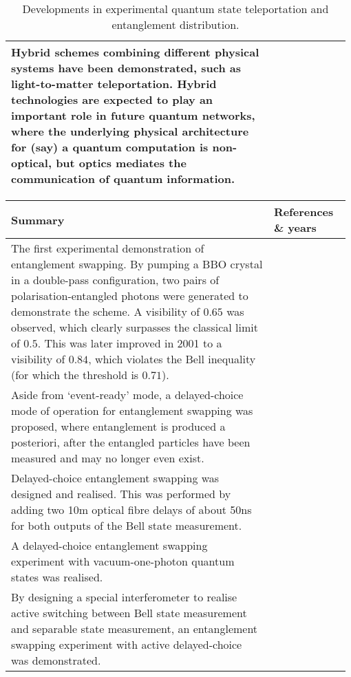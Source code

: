 \begin{table*}[!htbp]
\begin{tabular}{|p{0.755\linewidth}|p{0.22\linewidth}|}
	\hline
Hybrid schemes combining different physical systems have been demonstrated, such as light-to-matter teleportation. Hybrid technologies are expected to play an important role in future quantum networks, where the underlying physical architecture for (say) a quantum computation is non-optical, but optics mediates the communication of quantum information. & \cite{bib:Nat_443_557, bib:Nat_Comm_4_2744} \\
	\hline
\end{tabular}
\captionspacetab \caption{Developments in experimental quantum state teleportation and entanglement distribution.} \label{tab:state_tomo}
\end{table*}

\begin{table*}[!htbp]
	\begin{tabular}{|p{0.755\linewidth}|p{0.22\linewidth}|}
		\hline
		\textbf{Summary} & \textbf{References \& years} \\
		\hline \hline
		The first experimental demonstration of entanglement swapping. By pumping a BBO crystal in a double-pass configuration, two pairs of polarisation-entangled photons were generated to demonstrate the scheme. A visibility of \mbox{$0.65$} was observed, which clearly surpasses the classical limit of \mbox{$0.5$}. This was later improved in 2001 to a visibility of \mbox{$0.84$}, which violates the Bell inequality (for which the threshold is $0.71$).  & \cite{bib:PRL_80_3891, bib:jennewein2001experimental} \\
		\hline
		Aside from `event-ready' mode, a delayed-choice mode of operation for entanglement swapping was proposed, where entanglement is produced a posteriori, after the entangled particles have been measured and may no longer even exist.& \cite{bib:peres2000delayed}\\
		\hline
		Delayed-choice entanglement swapping was designed and realised. This was performed by adding two 10m optical fibre delays of about 50ns for both outputs of the Bell state measurement. & \cite{bib:PRL_88_017903}\\
		\hline
		A delayed-choice entanglement swapping experiment with vacuum-one-photon quantum states was realised. 
		& \cite{bib:PRA_66_024309}\\
		\hline
		By designing a special interferometer to realise active switching between Bell state measurement and separable state measurement, an entanglement swapping experiment with active delayed-choice was demonstrated. 

\end{tabular}
\end{table*}
